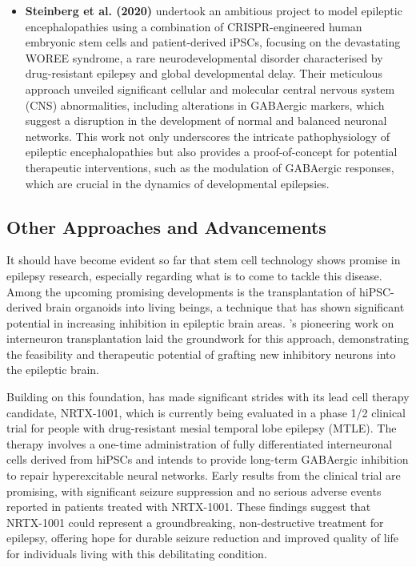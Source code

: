\documentclass[10pt]{article}
\begin{document}
\begin{sloppypar}
\begin{itemize}[leftmargin=*]
    \item \textbf{Steinberg et al. (2020)} undertook an ambitious project to model epileptic encephalopathies using a combination of CRISPR-engineered human embryonic stem cells and patient-derived iPSCs, focusing on the devastating WOREE syndrome, a rare neurodevelopmental disorder characterised by drug-resistant epilepsy and global developmental delay. Their meticulous approach unveiled significant cellular and molecular central nervous system (CNS) abnormalities, including alterations in GABAergic markers, which suggest a disruption in the development of normal and balanced neuronal networks. This work not only underscores the intricate pathophysiology of epileptic encephalopathies but also provides a proof-of-concept for potential therapeutic interventions, such as the modulation of GABAergic responses, which are crucial in the dynamics of developmental epilepsies.
  \end{itemize}

  \subsection{Other Approaches and Advancements}
  \label{sec:other-approaches-and-advancements}

  It should have become evident so far that stem cell technology shows promise in epilepsy research, especially regarding what is to come to tackle this disease. Among the upcoming promising developments is the transplantation of hiPSC-derived brain organoids into living beings, a technique that has shown significant potential in increasing inhibition in epileptic brain areas. \citeauthor{hunt_interneuron_2015} ’s \citeyearpar{hunt_interneuron_2015} pioneering work on interneuron transplantation laid the groundwork for this approach, demonstrating the feasibility and therapeutic potential of grafting new inhibitory neurons into the epileptic brain.

  Building on this foundation, \citeauthor{neurona_neurona_2022} \citeyearpar{neurona_neurona_2022} has made significant strides with its lead cell therapy candidate, NRTX-1001, which is currently being evaluated in a phase 1/2 clinical trial for people with drug-resistant mesial temporal lobe epilepsy (MTLE). The therapy involves a one-time administration of fully differentiated interneuronal cells derived from hiPSCs and intends to provide long-term GABAergic inhibition to repair hyperexcitable neural networks. Early results from the clinical trial are promising, with significant seizure suppression and no serious adverse events reported in patients treated with NRTX-1001. These findings suggest that NRTX-1001 could represent a groundbreaking, non-destructive treatment for epilepsy, offering hope for durable seizure reduction and improved quality of life for individuals living with this debilitating condition.


\end{sloppypar}
\end{document}
